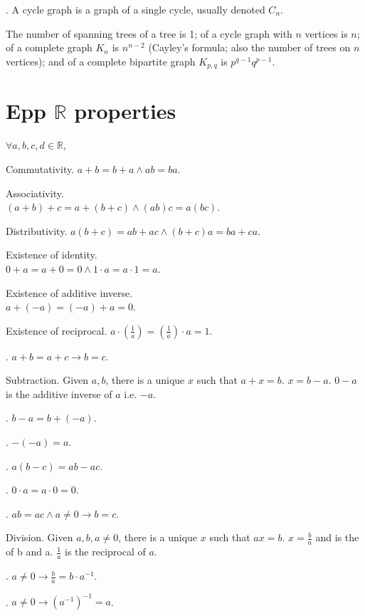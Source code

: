 \documentclass{slnotes}
\begin{document}
. A cycle graph is a graph of a single cycle, usually denoted \(C_n\).

The number of spanning trees of a tree is 1; of a cycle graph with \(n\) vertices is \(n\); of a complete graph \(K_n\) is \(n^{n-2}\) (Cayley's formula; also the number of trees on \(n\) vertices); and of a complete bipartite graph \(K_{p,q}\) is \(p^{q-1}q^{p-1}\).
\chapter{Epp \(\mathbb{R}\) properties}
\(\forall a,b,c,d \in \mathbb{R}\),

 Commutativity. \(a + b = b + a \land ab = ba\).

 Associativity.\\\((a + b) + c = a + (b + c) \land (ab)c = a(bc)\).

 Distributivity. \(a(b + c) = ab + ac \land (b + c)a = ba + ca\).

 Existence of identity.\\\(0 + a = a + 0 = 0 \land 1 \cdot a = a \cdot 1 = a\).

 Existence of additive inverse.\\\(a + (-a) = (-a) + a = 0\).

 Existence of reciprocal. \(a \cdot \left(\frac{1}{a}\right) = \left(\frac{1}{a}\right) \cdot a = 1\).

. \(a + b = a + c \to b = c\).

 Subtraction. Given \(a, b\), there is a unique \(x\) such that \(a + x = b\). \(x = b - a\). \(0 - a\) is the additive inverse of \(a\) i.e. \(-a\).

. \(b - a = b + (-a)\).

. \(-(-a) = a\).

. \(a(b - c) = ab - ac\).

. \(0 \cdot a = a \cdot 0 = 0\).

. \(ab = ac \land a \neq 0 \to b = c\).

 Division. Given \(a, b, a \neq 0\), there is a unique \(x\) such that \(ax = b\). \(x = \frac{b}{a}\) and is the  of b and a. \(\frac{1}{a}\) is the reciprocal of \(a\).

. \(a \neq 0 \to \frac{b}{a} = b \cdot a^{-1}\).

. \(a \neq 0 \to (a^{-1})^{-1} = a\).
\end{document}
